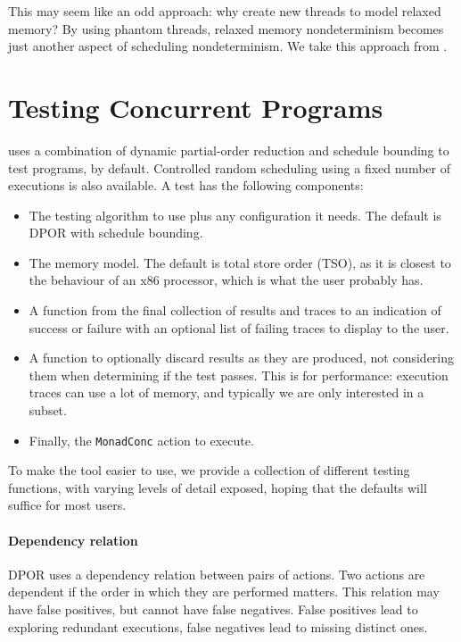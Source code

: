 This may seem like an odd approach: why create new threads to model
relaxed memory?  By using phantom threads, relaxed memory
nondeterminism becomes just another aspect of scheduling
nondeterminism.  We take this approach from \cite{zhang2015}.

\section{Testing Concurrent Programs}
\label{sec:dejafu-testing}

\dejafu{} uses a combination of dynamic partial-order reduction and
schedule bounding to test programs, by default.  Controlled random
scheduling using a fixed number of executions is also available.  A
\dejafu{} test has the following components:

\begin{itemize}
\item The testing algorithm to use plus any configuration it needs.
  The default is DPOR with schedule bounding.
\item The memory model.  The default is total store order (TSO), as it
  is closest to the behaviour of an x86 processor\cite{owens2009},
  which is what the user probably has.
\item A function from the final collection of results and traces to an
  indication of success or failure with an optional list of failing
  traces to display to the user.
\item A function to optionally discard results as they are produced,
  not considering them when determining if the test passes.  This is
  for performance: execution traces can use a lot of memory, and
  typically we are only interested in a subset.
\item Finally, the \verb|MonadConc| action to execute.
\end{itemize}

To make the tool easier to use, we provide a collection of different
testing functions, with varying levels of detail exposed, hoping that
the defaults will suffice for most users.

\paragraph{Dependency relation}
DPOR uses a dependency relation between pairs of actions.  Two actions
are dependent if the order in which they are performed matters.  This
relation may have false positives, but cannot have false negatives.
False positives lead to exploring redundant executions, false
negatives lead to missing distinct ones.

